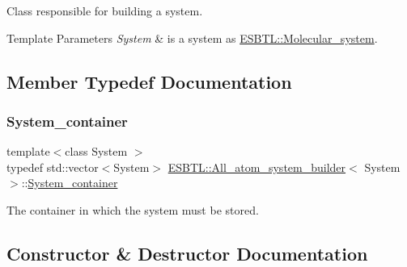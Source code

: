 Class responsible for building a system. 
\begin{DoxyTemplParams}{Template Parameters}
{\em System} & is a system as \hyperlink{classESBTL_1_1Molecular__system}{E\+S\+B\+T\+L\+::\+Molecular\+\_\+system}. \\
\hline
\end{DoxyTemplParams}


\subsection{Member Typedef Documentation}
\mbox{\label{classESBTL_1_1All__atom__system__builder_a31fb2f5199f57623e8c3582405d3c0bb}} 
\subsubsection{\texorpdfstring{System\+\_\+container}{System\_container}}
{\footnotesize\ttfamily template$<$class System $>$ \\
typedef std\+::vector$<$System$>$ \hyperlink{classESBTL_1_1All__atom__system__builder}{E\+S\+B\+T\+L\+::\+All\+\_\+atom\+\_\+system\+\_\+builder}$<$ System $>$\+::\hyperlink{classESBTL_1_1All__atom__system__builder_a31fb2f5199f57623e8c3582405d3c0bb}{System\+\_\+container}}

The container in which the system must be stored. 

\subsection{Constructor \& Destructor Documentation}
\mbox{\label{classESBTL_1_1All__atom__system__builder_a21d079ea5c05ee7063255846fce8ad8b}} 
